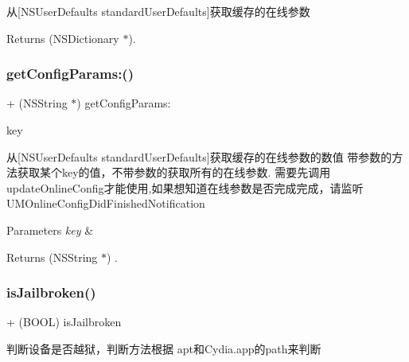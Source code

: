 从\mbox{[}N\+S\+User\+Defaults standard\+User\+Defaults\mbox{]}获取缓存的在线参数 \begin{DoxyReturn}{Returns}
(N\+S\+Dictionary $\ast$). 
\end{DoxyReturn}
\mbox{\label{interfaceMobClick_ad1a63bdab1a21d495a767929d41cf0ef}} 
\subsubsection{\texorpdfstring{get\+Config\+Params\+:()}{getConfigParams:()}}
{\footnotesize\ttfamily + (N\+S\+String $\ast$) get\+Config\+Params\+: \begin{DoxyParamCaption}\item[{(N\+S\+String $\ast$)}]{key }\end{DoxyParamCaption}}

从\mbox{[}N\+S\+User\+Defaults standard\+User\+Defaults\mbox{]}获取缓存的在线参数的数值 带参数的方法获取某个key的值，不带参数的获取所有的在线参数. 需要先调用update\+Online\+Config才能使用,如果想知道在线参数是否完成完成，请监听\+U\+M\+Online\+Config\+Did\+Finished\+Notification


\begin{DoxyParams}{Parameters}
{\em key} & \\
\hline
\end{DoxyParams}
\begin{DoxyReturn}{Returns}
(N\+S\+String $\ast$) . 
\end{DoxyReturn}
\mbox{\label{interfaceMobClick_ae7c6a5472047a7b1c4173d291c3bea8e}} 
\subsubsection{\texorpdfstring{is\+Jailbroken()}{isJailbroken()}}
{\footnotesize\ttfamily + (B\+O\+OL) is\+Jailbroken \begin{DoxyParamCaption}{ }\end{DoxyParamCaption}}

判断设备是否越狱，判断方法根据 apt和\+Cydia.\+app的path来判断 \mbox{\label{interfaceMobClick_ae04aba448c037bb205c18f9d4e7bc0f0}} 
